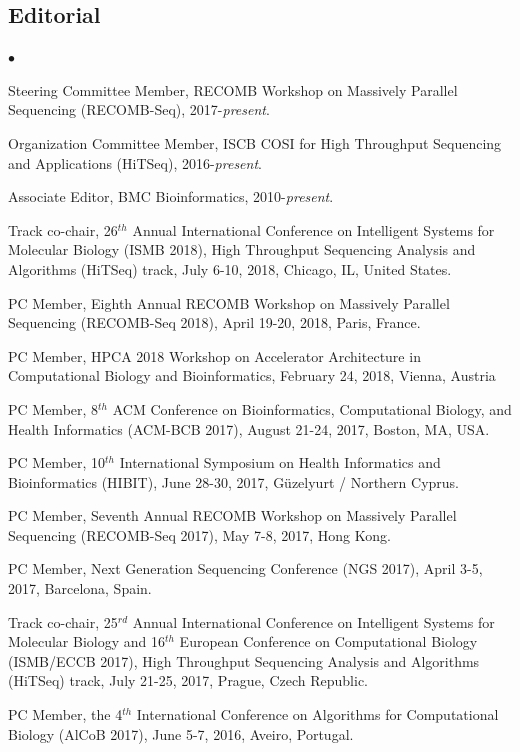 \documentclass[margin,line]{res}
\newenvironment{list2}{
  \begin{list}{$\bullet$}{%
      \setlength{\itemsep}{0in}
      \setlength{\parsep}{0in} \setlength{\parskip}{0in}
      \setlength{\topsep}{0in} \setlength{\partopsep}{0in} 
      \setlength{\leftmargin}{0.2in}}}{\end{list}}
\begin{document}
\begin{resume}
\subsection{\small \sc Editorial}
\begin{list2}
\item
  Steering Committee Member, RECOMB Workshop on Massively Parallel Sequencing (RECOMB-Seq), 2017-{\it present}.
\item
  Organization Committee Member, ISCB COSI for High Throughput Sequencing and Applications (HiTSeq),
  2016-{\it present}.
\item
  Associate Editor, BMC Bioinformatics, 2010-{\it present}.
\item
  Track co-chair, 26$^{th}$ Annual International Conference on Intelligent Systems for Molecular Biology
  (ISMB 2018), 
  High Throughput Sequencing Analysis and Algorithms (HiTSeq) track, July 6-10, 2018, Chicago, IL, United States.
\item
  PC Member,  Eighth Annual RECOMB Workshop on Massively Parallel Sequencing 
  (RECOMB-Seq 2018), April 19-20, 2018, Paris, France.
\item
  PC Member, 
HPCA 2018 Workshop on Accelerator Architecture in Computational Biology and Bioinformatics, February 24, 2018, Vienna, Austria
\item
  PC Member,  8$^{th}$ ACM Conference on Bioinformatics, Computational Biology, and Health Informatics
  (ACM-BCB 2017), August 21-24, 2017, Boston, MA, USA.
\item
  PC Member,  10$^{th}$ International Symposium on Health Informatics and Bioinformatics
  (HIBIT), June 28-30, 2017, Güzelyurt / Northern Cyprus.
\item
  PC Member,  Seventh Annual RECOMB Workshop on Massively Parallel Sequencing 
  (RECOMB-Seq 2017), May 7-8, 2017, Hong Kong.
\item
  PC Member,  Next Generation Sequencing Conference
  (NGS 2017), April 3-5, 2017, Barcelona, Spain.
\item
  Track co-chair, 25$^{rd}$ Annual International Conference on Intelligent Systems for Molecular Biology and 16$^{th}$ European Conference on 
  Computational Biology  (ISMB/ECCB 2017), 
  High Throughput Sequencing Analysis and Algorithms (HiTSeq) track, July 21-25, 2017, Prague, Czech Republic.
\item
  PC Member, the 4$^{th}$ International Conference on Algorithms for Computational Biology (AlCoB 2017),
  June 5-7, 2016, Aveiro, Portugal.
\item

\end{list2}
\end{resume}
\end{document}
